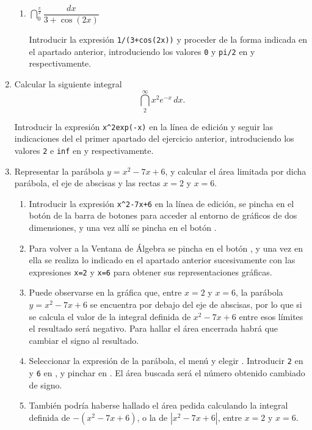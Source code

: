 \begin{enumerate}[leftmargin=*]
\begin{enumerate}
\item $ \dint^{\frac{\pi}{2}}_{0}{\dfrac{dx}{3+\cos(2x)}}$
\begin{indicacion}
Introducir la expresión \verb|1/(3+cos(2x))| y proceder de la forma indicada en el apartado anterior, introduciendo los valores
\verb|0| y \verb|pi/2| en  y  respectivamente.
\end{indicacion}
\end{enumerate}


\item Calcular la siguiente integral
\[
\  \dint_{2}^{\infty}{x^{2}e^{-x}\,dx}.
\]
\begin{indicacion}
Introducir la expresión \verb|x^2exp(-x)| en la línea de edición y seguir las indicaciones del el primer apartado del ejercicio anterior,
introduciendo los valores \verb|2| e \verb|inf| en  y  respectivamente.
\end{indicacion}


\item Representar la parábola $y=x^{2}-7x+6$, y calcular el área limitada por dicha parábola, el eje de abscisas y las rectas $x=2$ y $x=6$.
\begin{indicacion}
\begin{enumerate}
\item Introducir la expresión \verb|x^2-7x+6| en la línea de edición, se pincha en el botón  de la barra de botones
para acceder al entorno de gráficos de dos dimensiones, y una vez allí se pincha en el botón .
\item Para volver a la Ventana de Álgebra se pincha en el botón , y una vez en ella se realiza lo
indicado en el apartado anterior sucesivamente con las expresiones \verb|x=2| y \verb|x=6| para obtener sus representaciones gráficas.
\item Puede observarse en la gráfica que, entre $x=2$ y $x=6$, la parábola $y=x^{2}-7x+6$ se encuentra por debajo del eje de abscisas, por
lo que si se calcula el valor de la integral definida de $x^{2}-7x+6$ entre esos límites el resultado será negativo. Para hallar el área
encerrada habrá que cambiar el signo al resultado.
\item Seleccionar la expresión de la parábola, el menú  y elegir . Introducir
\verb|2| en  y \verb|6| en , y pinchar en . El área buscada será el
número obtenido cambiado de signo.
\item También podría haberse hallado el área pedida calculando la integral definida de $-(x^{2}-7x+6)$, o la de $|x^{2}-7x+6|$, entre $x=2$
y $x=6$.
\end{enumerate}
\end{indicacion}



\end{enumerate}
